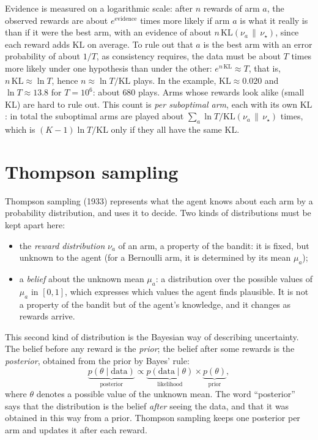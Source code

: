 \begin{intuition}
  Evidence is measured on a logarithmic scale: after $n$ rewards of arm
  $a$, the observed rewards are about $e^{\text{evidence}}$ times more
  likely if arm $a$ is what it really is than if it were the best arm, with
  an evidence of about $n\, \mathrm{KL}(\nu_a \,\|\, \nu_\star)$, since
  each reward adds $\mathrm{KL}$ on average. To rule out that $a$ is the
  best arm with an error probability of about $1/T$, as consistency
  requires, the data must be about $T$ times more likely under one
  hypothesis than under the other: $e^{n\, \mathrm{KL}} \approx T$, that
  is, $n\, \mathrm{KL} \approx \ln T$, hence $n \approx \ln T /
  \mathrm{KL}$ plays. In the example, $\mathrm{KL} \approx 0.020$ and $\ln
  T \approx 13.8$ for $T = 10^6$: about $680$ plays. Arms whose rewards look
  alike (small $\mathrm{KL}$) are hard to rule out. This count is
  \emph{per suboptimal arm}, each with its own $\mathrm{KL}$: in total the
  suboptimal arms are played about $\sum_a \ln T / \mathrm{KL}(\nu_a \,\|\,
  \nu_\star)$ times, which is $(K - 1) \ln T / \mathrm{KL}$ only if they all
  have the same $\mathrm{KL}$.
\end{intuition}

\section{Thompson sampling}

Thompson sampling (1933) represents what the agent knows about each arm by
a probability distribution, and uses it to decide. Two kinds of
distributions must be kept apart here:
\begin{itemize}[nosep]
  \item the \emph{reward distribution} $\nu_a$ of an arm, a property of the
    bandit: it is fixed, but unknown to the agent (for a Bernoulli arm, it
    is determined by its mean $\mu_a$);
  \item a \emph{belief} about the unknown mean $\mu_a$: a distribution over
    the possible values of $\mu_a$ in $[0, 1]$, which expresses which values
    the agent finds plausible. It is not a property of the bandit but of the
    agent's knowledge, and it changes as rewards arrive.
\end{itemize}
This second kind of distribution is the Bayesian way of describing
uncertainty. The belief before any reward is the \emph{prior}; the belief
after some rewards is the \emph{posterior}, obtained from the prior by
Bayes' rule:
\begin{equation}
  \label{eq:bayes}
  \underbrace{p(\theta \mid \text{data})}_{\text{posterior}} \propto
  \underbrace{p(\text{data} \mid \theta)}_{\text{likelihood}} \times
  \underbrace{p(\theta)}_{\text{prior}},
\end{equation}
where $\theta$ denotes a possible value of the unknown mean. The word
``posterior'' says that the distribution is the belief \emph{after} seeing
the data, and that it was obtained in this way from a prior. Thompson
sampling keeps one posterior per arm and updates it after each reward.

